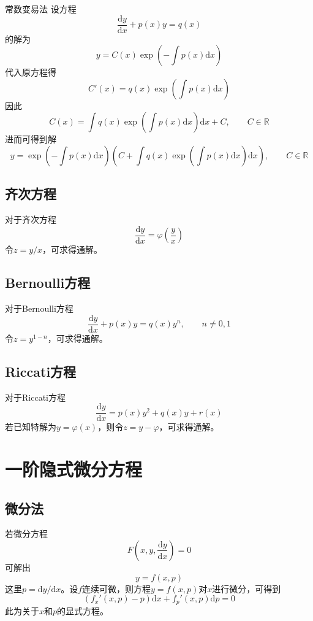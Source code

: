 \documentclass[lang = cn, scheme = chinese, thmcnt = section]{elegantbook}
\newcommand{\R}{\mathbb{R}}            %
\newcommand{\dd}{\mathrm{d}}           %
\begin{document}
\begin{theorem}{常数变易法}
	设方程
	$$
	\frac{\mathrm{d}{y}}{\mathrm{d}{x}}+p(x)y=q(x)
	$$
	的解为%
	$$
	y=C(x)\exp\left(-\int{p(x)\mathrm{d}{x}}\right)
	$$
	代入原方程得%
	$$
	C'(x)=q(x)\exp\left(\int{p(x)\mathrm{d}{x}}\right)
	$$
	因此%
	$$
	C(x)=\int q(x)\exp\left(\int{p(x)\mathrm{d}{x}}\right)\dd x+C,\qquad C\in\R
	$$
	进而可得到解
	$$
	y=\exp\left(-\int p(x)\mathrm{d} x\right)
	\left(C+\int q(x)\exp\left(\int p(x)\mathrm{d} x\right)\mathrm{d} x\right),\qquad C\in \R
	$$
\end{theorem}

\subsection{齐次方程}

\begin{theorem}
	对于齐次方程
	$$
	\frac{\dd y}{\dd x}=\varphi\left(\frac{y}{x}\right)
	$$
	令$z=y/x$，可求得通解。
\end{theorem}

\subsection{Bernoulli方程}

\begin{theorem}
	对于Bernoulli方程
	$$
	\frac{\mathrm{d}{y}}{\mathrm{d}{x}}+p(x)y=q(x)y^n,\qquad n\neq0,1
	$$
	令$z=y^{1-n}$，可求得通解。
\end{theorem}

\subsection{Riccati方程}

\begin{theorem}
	对于Riccati方程
	$$
	\frac{\mathrm{d}{y}}{\mathrm{d}{x}}=p(x)y^2+q(x)y+r(x)
	$$
	若已知特解为$y=\varphi(x)$，则令$z=y-\varphi$，可求得通解。
\end{theorem}

\section{一阶隐式微分方程}

\subsection{微分法}

若微分方程
$$
F\left(x,y,\frac{\mathrm{d}y}{\mathrm{d}x}\right)=0
$$
可解出
$$
y=f(x,p)
$$
这里$p=\dd y/\dd x$。设$f$连续可微，则方程$y=f(x,p)$对$x$进行微分，可得到
$$
(f_x'(x,p)-p)\mathrm{d}x+f_p'(x,p)\mathrm{d}p=0
$$
此为关于$x$和$p$的显式方程。
\end{document}
